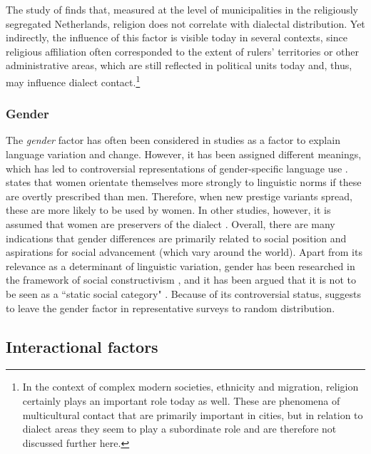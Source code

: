 \documentclass[output=paper]{langscibook}
\begin{document}
 The study of \citet[][16]{manni2006extent} finds that, measured at the level of municipalities in the religiously segregated Netherlands, religion does not correlate with dialectal distribution. Yet indirectly, the influence of this factor is visible today in several contexts, since religious affiliation often corresponded to the extent of rulers' territories or other administrative areas, which are still reflected in political units today and, thus, may influence dialect contact.\footnote{In the context of complex modern societies, ethnicity and migration, religion certainly plays an important role today as well. These are phenomena of multicultural contact that are primarily important in cities, but in relation to dialect areas they seem to play a subordinate role and are therefore not discussed further here.}\\

\subsubsection{Gender}

The \textit{gender} factor has often been considered in studies as a factor to explain language variation and change. However, it has been assigned different meanings, which has led to controversial representations of gender-specific language use \parencite[228]{Diercks1986}. \textcite[367]{Labov2001} states that women orientate themselves more strongly to linguistic norms if these are overtly prescribed than men. Therefore, when new prestige variants spread, these are more likely to be used by women. In other studies, however, it is assumed that women are preservers of the dialect \parencite[see, e.g.,][299]{Sieburg1991}. Overall, there are many indications that gender differences are primarily related to social position and aspirations for social advancement (which vary around the world). Apart from its relevance as a determinant of linguistic variation, gender has been researched in the framework of social constructivism \parencite[368]{Queen2013}, and it has been argued that it is not to be seen as a “static social category" \parencite[383]{Queen2013}.
Because of its controversial status, \citet{Mattheier1994} suggests to leave the gender factor in representative surveys to random distribution.

\subsection{Interactional factors}
\end{document}
